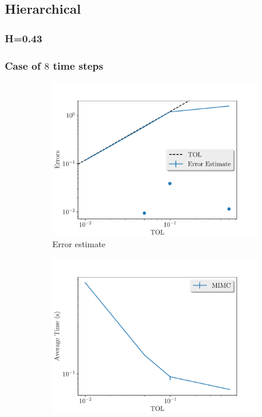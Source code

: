 \documentclass[11pt]{article}
\begin{document}
\subsection{Hierarchical}
\subsubsection*{H=0.43}
\newpage
\subsubsection*{Case of $8$ time steps}
\begin{figure}[!h]
	\centering
	\begin{subfigure}{.4\textwidth}
		\centering
		\includegraphics[width=1\linewidth]{./figures/bergomi_misc/H_043/N_8/error_estimate.pdf}
		\caption{Error estimate}
		\label{fig:misc_rbergomi_8_steps_sub1}
	\end{subfigure}%
	\begin{subfigure}{.4\textwidth}
		\centering
		\includegraphics[width=1\linewidth]{./figures/bergomi_misc/H_043/N_8/average_running_time.pdf}

\end{subfigure}
\end{figure}
\end{document}
